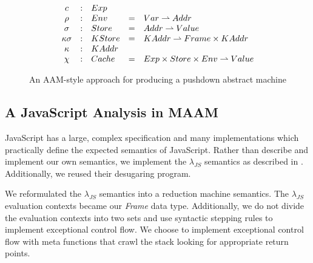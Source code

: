 \documentclass[10pt,letter,english]{article}
\newcommand{\partto}{\rightharpoonup}
\newcommand{\js}[0]{JavaScript}
\newcommand{\lambdajs}[0]{$\lambda_{JS}$}
\newcommand{\cek}[3]{\langle #1, #2, #3 \rangle}
\newcommand{\cesk}[4]{\langle #1, #2, #3, #4 \rangle}
\newcommand{\cessk}[5]{\langle #1, #2, #3, #4, #5 \rangle}
\newcommand{\cesskc}[6]{\langle #1, #2, #3, #4, #5, #6 \rangle}
\begin{document}
\begin{figure}
\centering

\begin{equation*}
\begin{array}{c c l c l}
  c            &:& Exp        && \\
  \rho         &:& Env        &=& Var   \partto Addr \\
  \sigma       &:& Store      &=& Addr  \partto Value \\
  \kappa\sigma &:& KStore     &=& KAddr \partto Frame \times KAddr \\
  \kappa       &:& KAddr      && \\
  \chi         &:& Cache      &=& Exp \times Store \times Env \partto Value
\end{array}
\end{equation*}


\caption{An AAM-style approach for producing a pushdown abstract machine} \label{fig:M1}
\end{figure}

\subsection{A JavaScript Analysis in MAAM}

\js{} has a large, complex specification and many implementations which
practically define the expected semantics of \js{}. Rather than describe and
implement our own semantics, we implement the \lambdajs{} semantics as described
in \cite{lambdajs}. Additionally, we reused their desugaring program.

We reformulated the \lambdajs{} semantics into a reduction machine
semantics. The \lambdajs{} evaluation contexts became our \emph{Frame} data
type. Additionally, we do not divide the evaluation contexts into two sets and
use syntactic stepping rules to implement exceptional control flow. We choose to
implement exceptional control flow with meta functions that crawl the stack
looking for appropriate return points.
\end{document}
